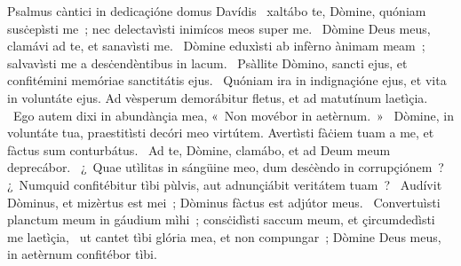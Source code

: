 { Psalmus càntici in dedicaçióne domus Davídis}
{%
~xaltábo te, Dòmine, quóniam susċepìsti me~; nec delectavìsti inimícos meos super me. 
~Dòmine Deus meus, clamávi ad te, et sanavìsti me. 
~Dòmine eduxìsti ab infèrno ànimam meam~; salvavìsti me a desċendèntibus in lacum. 
~Psàllite Dòmino, sancti ejus, et confitémini memóriae sanctitátis ejus. 
~Quóniam ira in indignaçióne ejus, et vita in voluntáte ejus. Ad vèsperum demorábitur fletus, et ad matutínum laetìçia. 
~Ego autem dixi in abundànçia mea, «~Non movébor in aetèrnum.~»
~Dòmine, in voluntáte tua, praestitìsti decóri meo virtútem. Avertìsti fàċiem tuam a me, et fàctus sum conturbátus. 
~Ad te, Dòmine, clamábo, et ad Deum meum deprecábor. 
~¿~Quae utìlitas in sángüine meo, dum desċèndo in corrupçiónem~? ¿~Numquid confitébitur tìbi pùlvis, aut adnunçiábit veritátem tuam~? 
~Audívit Dòminus, et mizèrtus est mei~; Dòminus fàctus est adjútor meus. 
~Convertuìsti planctum meum in gáudium mìhi~; consċidìsti saccum meum, et çircumdedìsti me laetìçia, 
~ut cantet tìbi glória mea, et non compungar~; Dòmine Deus meus, in aetèrnum confitébor tìbi. 
}

